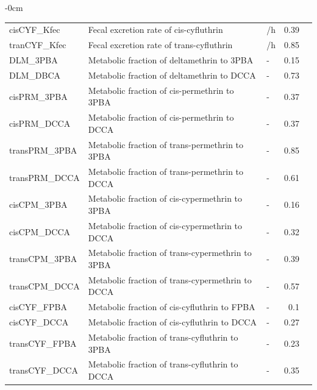 \documentclass[toxics,article,accept,pdftex,moreauthors]{Definitions/mdpi}
\begin{document}
\begin{table}[H]
\begin{adjustwidth}{-\extralength}{0cm}
{\begin{tabular}{lllrr}
cisCYF\_Kfec & Fecal excretion  rate of cis-cyfluthrin & /h & 0.39 & \cite{quindroit2019estimating}\\
tranCYF\_Kfec & Fecal excretion  rate of trans-cyfluthrin & /h & 0.85 & \cite{quindroit2019estimating}\\
DLM\_3PBA & Metabolic fraction of deltamethrin to 3PBA & - & 0.15 & \cite{quindroit2019estimating}\\
DLM\_DBCA & Metabolic fraction of deltamethrin to DCCA & - & 0.73 & \cite{quindroit2019estimating}\\
cisPRM\_3PBA & Metabolic fraction of cis-permethrin to 3PBA & - & 0.37 & \cite{quindroit2019estimating}\\
cisPRM\_DCCA & Metabolic fraction of cis-permethrin to DCCA & - & 0.37 & \cite{quindroit2019estimating}\\
transPRM\_3PBA & Metabolic fraction of trans-permethrin to 3PBA & - & 0.85 & \cite{quindroit2019estimating}\\
transPRM\_DCCA & Metabolic fraction of trans-permethrin to DCCA & - & 0.61 & \cite{quindroit2019estimating}\\
cisCPM\_3PBA & Metabolic fraction of cis-cypermethrin to 3PBA & - & 0.16 & \cite{quindroit2019estimating}\\
cisCPM\_DCCA & Metabolic fraction of cis-cypermethrin to DCCA & - & 0.32 & \cite{quindroit2019estimating}\\
transCPM\_3PBA & Metabolic fraction of trans-cypermethrin to 3PBA & - & 0.39 & \cite{quindroit2019estimating}\\
transCPM\_DCCA & Metabolic fraction of trans-cypermethrin to DCCA & - & 0.57 & \cite{quindroit2019estimating}\\
cisCYF\_FPBA & Metabolic fraction of cis-cyfluthrin to FPBA & - & 0.1 & \cite{quindroit2019estimating}\\
cisCYF\_DCCA & Metabolic fraction of cis-cyfluthrin to DCCA & - & 0.27 & \cite{quindroit2019estimating}\\
transCYF\_FPBA & Metabolic fraction of trans-cyfluthrin to 3PBA & - & 0.23 & \cite{quindroit2019estimating}\\
transCYF\_DCCA & Metabolic fraction of trans-cyfluthrin to DCCA & - & 0.35 & \cite{quindroit2019estimating}\\
\bottomrule
\end{tabular}}
\end{adjustwidth}
\end{table}
\unskip
\end{document}
